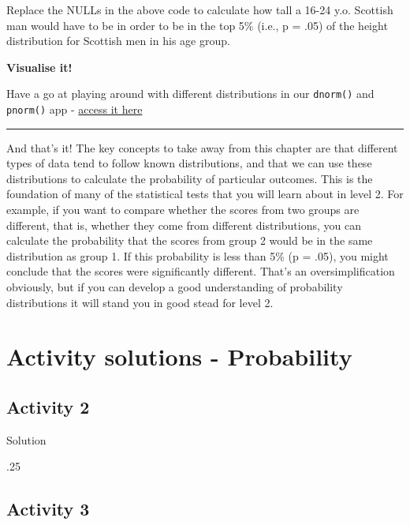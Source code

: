 \documentclass[
  oneside]{book}
\newenvironment{Shaded}{\begin{snugshade}}{\end{snugshade}}
\newcommand{\DecValTok}[1]{\textcolor[rgb]{0.00,0.00,0.81}{#1}}
\newcommand{\NormalTok}[1]{#1}
\begin{document}
Replace the NULLs in the above code to calculate how tall a 16-24 y.o. Scottish man would have to be in order to be in the top 5\% (i.e., p = .05) of the height distribution for Scottish men in his age group.

\textbf{Visualise it!}

Have a go at playing around with different distributions in our \texttt{dnorm()} and \texttt{pnorm()} app - \href{http://shiny.psy.gla.ac.uk/jackt/ShinyPsyTeachR/ug1/normal-distributions/}{access it here}

\begin{center}\rule{0.5\linewidth}{0.5pt}\end{center}

And that's it! The key concepts to take away from this chapter are that different types of data tend to follow known distributions, and that we can use these distributions to calculate the probability of particular outcomes. This is the foundation of many of the statistical tests that you will learn about in level 2. For example, if you want to compare whether the scores from two groups are different, that is, whether they come from different distributions, you can calculate the probability that the scores from group 2 would be in the same distribution as group 1. If this probability is less than 5\% (p = .05), you might conclude that the scores were significantly different. That's an oversimplification obviously, but if you can develop a good understanding of probability distributions it will stand you in good stead for level 2.

\hypertarget{activity-solutions---probability}{%
\section{Activity solutions - Probability}\label{activity-solutions---probability}}

\hypertarget{activity-2-4}{%
\subsection{Activity 2}\label{activity-2-4}}

Solution

\begin{Shaded}
\begin{Highlighting}[]
\NormalTok{.}\DecValTok{25}
\end{Highlighting}
\end{Shaded}

\hypertarget{activity-3-5}{%
\subsection{Activity 3}\label{activity-3-5}}
\end{document}
